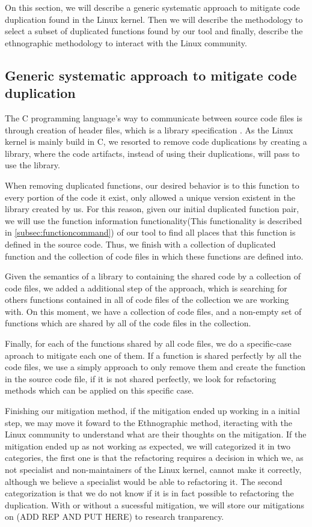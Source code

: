 On this section, we will describe a generic systematic approach to mitigate code duplication found in the Linux kernel. Then we
will describe the methodology to select a subset of duplicated functions found by our tool and finally, describe the ethnographic
methodology to interact with the Linux community.


\subsection{Generic systematic approach to mitigate code duplication}

\label{subsec:pipeline}

The C programming language's way to communicate between source code files is through creation of header files, which is
a library specification \citep{Cbook}. As the Linux kernel is mainly build in C, we resorted to remove code duplications by
creating a library, where the code artifacts, instead of using their duplications, will pass to use the library.

When removing duplicated functions, our desired behavior is to this function to every portion of the code it exist, only allowed a
unique version existent in the library created by us. For this reason, given our initial duplicated function pair, we will use 
the function information functionality(This functionality is described in \ref{subsec:functioncommand}) of our tool to find all 
places that this function is defined in the source code. Thus, we finish with a collection of duplicated function and the collection
of code files in which these functions are defined into.

Given the semantics of a library to containing the shared code by a collection of code files, we added a additional step of the 
approach, which is searching for others functions contained in all of code files of the collection we are working with. 
On this moment, we have a collection of code files, and a non-empty set of functions which are shared by all of the code files 
in the collection.

Finally, for each of the functions shared by all code files, we do a specific-case aproach to mitigate each one of them.
If a function is shared perfectly by all the code files, we use a simply approach to only remove them and create the function in
the source code file, if it is not shared perfectly, we look for refactoring methods which can be applied on this specific case. 

Finishing our mitigation method, if the mitigation ended up working in a initial step, we may move it foward to the 
Ethnographic method, iteracting with the Linux community to understand what are their thoughts on the mitigation. If the mitigation
ended up as not working as expected, we will categorized it in two categories, the first one is that the refactoring requires a
decision in which we, as not specialist and non-maintainers of the Linux kernel, cannot make it correctly, although
we believe a specialist would be able to refactoring it. The second categorization is that we do not know if it is in fact possible
to refactoring the duplication. With or without a sucessful mitigation, we will store our mitigations on (ADD REP AND PUT HERE) 
to research tranparency.


